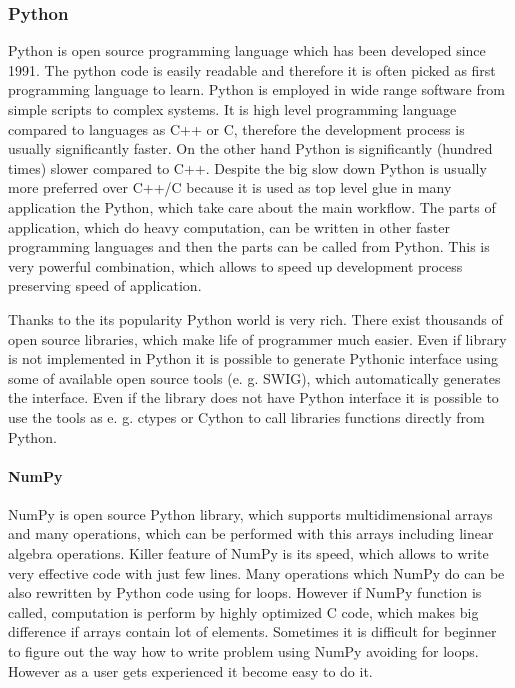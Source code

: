 \documentclass[a4paper,12pt]{article}
\begin{document}
\subsubsection{Python}

Python is open source programming language which has been developed since 1991. 
The python code is easily readable and therefore it is often picked as first programming
language to learn. Python is employed in wide range software from simple scripts to complex systems.
It is high level programming language compared to languages as C++ or C, therefore 
the development process is usually significantly faster. On the other hand 
Python is significantly (hundred times) slower compared to C++. Despite the big 
slow down Python is usually more preferred over C++/C because 
it is used as top level glue in many application the Python, which take care about 
the main workflow. The parts of application, which do heavy computation, can 
be written in other faster programming languages and then the parts can be called 
from Python. This is very powerful combination, which allows to speed up development 
process preserving speed of application.

Thanks to the its popularity Python world is very rich. There exist
thousands of open source libraries, which make life of programmer much easier. Even 
if library is not implemented in Python it is possible to generate Pythonic 
interface using some of available open source tools (e. g. SWIG), which automatically
generates the interface. Even if the library does not have Python interface it 
is possible to use the tools as e. g. ctypes or Cython to call libraries functions directly from Python.

\paragraph{NumPy}

NumPy is open source Python library, which supports multidimensional arrays and many operations, which can be
performed with this arrays including linear algebra operations. Killer feature of NumPy is its speed,
which allows to write very effective code with just few lines. Many operations which NumPy do can be 
also rewritten by Python code using  for loops. However if NumPy function is called,
computation is perform by highly optimized C code, which makes big difference if arrays contain 
lot of elements. Sometimes it is difficult for beginner to figure out the way how 
to write problem using NumPy avoiding for loops. However as a user gets experienced 
it become easy to do it. 
\end{document}
